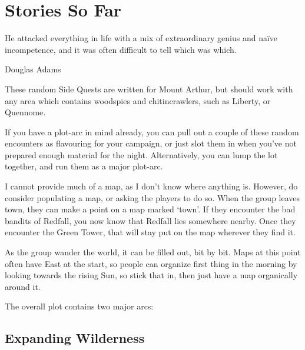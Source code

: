 \chapter{Stories So Far}
	\epigraph{He attacked everything in life with a mix of extraordinary genius and na\"ive incompetence, and it was often difficult to tell which was which.}{Douglas Adams}

\begin{multicols}{2}

\noindent
These random Side Quests are written for Mount Arthur, but should work with any area which contains woodspies and chitincrawlers, such as Liberty, or Quennome.

If you have a plot-arc in mind already, you can pull out a couple of these random encounters as flavouring for your campaign, or just slot them in when you've not prepared enough material for the night.
Alternatively, you can lump the lot together, and run them as a major plot-arc.

I cannot provide much of a map, as I don't know where anything is.
However, do consider populating a map, or asking the players to do so.
When the group leaves \gls{town}, they can make a point on a map marked `town'.
If they encounter the bad bandits of Redfall, you now know that Redfall lies somewhere nearby.
Once they encounter the Green Tower, that will stay put on the map wherever they find it.

As the group wander the world, it can be filled out, bit by bit.
Maps at this point often have East at the start, so people can organize first thing in the morning by looking towards the rising Sun, so stick that in, then just have a map organically around it.

The overall plot contains two major arcs:

\end{multicols}

\section{Expanding Wilderness}


